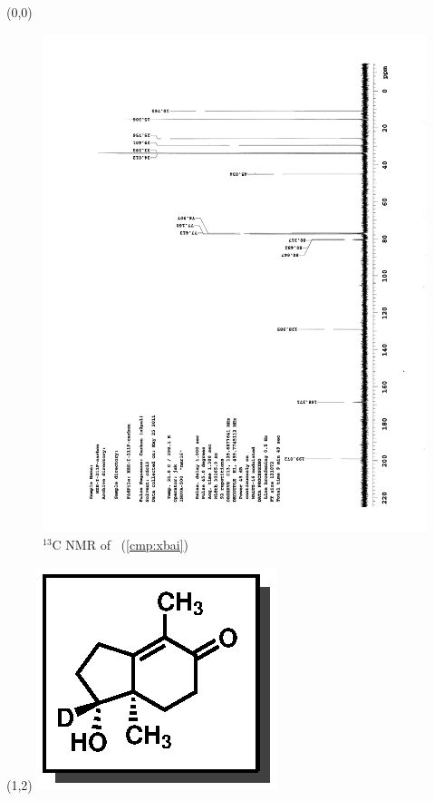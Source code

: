 \clearpage
\begin{textblock}{20}(0,0)
\begin{figure}[htb]
\caption{$^{13}$C NMR of  \CMPxbai\ (\ref{cmp:xbai})}
\includegraphics[scale=0.75, trim = 0mm 0mm 0mm 5mm,
clip]{chp_singlecarbon/images/nmr/xbaiC}
\vspace{-100pt}
\end{figure}
\end{textblock}
\begin{textblock}{1}(1,2)
\includegraphics[scale=0.8, angle=90]{chp_singlecarbon/images/xbai}
\end{textblock}
\clearpage

